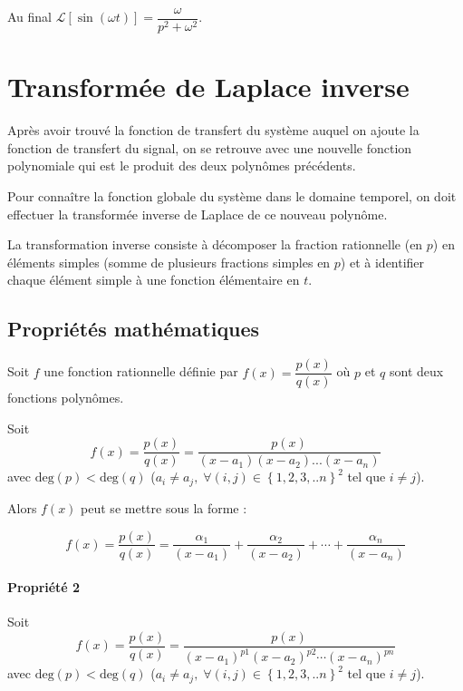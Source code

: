 \documentclass[10pt,fleqn]{article} %
\begin{document}
Au final $\mathcal{L}\left[\sin(\omega t) \right] = \dfrac{\omega}{p^2+\omega^2}$.


\section{Transformée de Laplace inverse}

Après avoir trouvé la fonction de transfert du système auquel on ajoute la
fonction de transfert du signal, on se retrouve avec une nouvelle fonction
polynomiale qui est le produit des deux polynômes précédents. 

Pour connaître la fonction globale du système dans le domaine temporel, on doit
effectuer la transformée inverse de Laplace de ce nouveau polynôme. 

La transformation inverse consiste à décomposer la fraction rationnelle (en $p$)
en éléments simples (somme de plusieurs fractions simples en $p$) et à
identifier chaque élément simple à une fonction élémentaire en $t$.

\subsection{Propriétés mathématiques}
Soit $f$ une fonction rationnelle définie par $f(x)
=\dfrac{p(x)}{q(x)}$ où $p$ et $q$ sont deux fonctions polynômes. 

Soit
$$
f(x)=\dfrac{p(x)}{q(x)}=
\dfrac{p(x)}{\left(x-a_1 \right)\left(x-a_2 \right)...\left(x-a_n \right)}
$$
avec $\text{deg}(p)<\text{deg}(q)$ ($a_i\neq a_j,\; \forall (i,j) \in \left\{1,2,3,..n
\right\}^2$ tel que $i\neq j$).

Alors $f(x)$ peut se mettre sous la forme :

$$
f(x)=\dfrac{p(x)}{q(x)}=
\dfrac{\alpha_1}{\left(x-a_1 \right)}
+\dfrac{\alpha_2}{\left(x-a_2 \right)}
+\cdots
+\dfrac{\alpha_n}{\left(x-a_n \right)}
$$


\paragraph*{Propriété 2}
Soit
$$
f(x)=\dfrac{p(x)}{q(x)}=
\dfrac{p(x)}{\left(x-a_1 \right)^{p1}\left(x-a_2 \right)^{p2}\cdots\left(x-a_n
\right)^{pn}}
$$
avec $\text{deg}(p)<\text{deg}(q)$ ($a_i\neq a_j,\; \forall (i,j) \in \left\{1,2,3,..n
\right\}^2$ tel que $i\neq j$).
\end{document}
